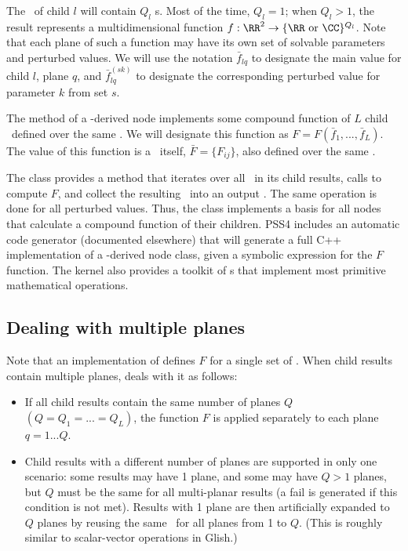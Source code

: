   The \Result\ of child $l$ will contain $Q_l$ \VellSet{}s. Most of the time,
  $Q_l=1$; when $Q_l>1$, the result represents a multidimensional function
  $f:\RR^2\rightarrow\{\RR\mbox{ or }\CC\}^{Q_l}$. Note that each plane of such
  a function may have its own set of solvable parameters and perturbed values.
  We will use the notation $\bar{f}_{lq}$ to designate the main value for child
  $l$, plane $q$, and $\bar{f}^{(sk)}_{lq}$ to designate the corresponding
  perturbed value for parameter $k$ from set $s$.

  The  method of a -derived node implements some
  compound function of $L$ child \Vells\ defined over the same \Cells. We will
  designate this function as $F=F(\bar{f}_1,...,\bar{f}_L)$. The value of this
  function is a \Vells\ itself, $\bar{F} = \{F_{ij}\}$, also defined over the
  same \Cells. 

  The  class provides a  method that iterates over
  all \Vells\ in its child results, calls  to compute $F$, and
  collect the resulting \Vells\ into an output \Result. The same operation is
  done for all perturbed values. Thus, the  class implements a
  basis for all nodes that calculate a compound function of their children.
  PSS4 includes an automatic code generator (documented elsewhere) that will
  generate a full C++ implementation of a -derived node class,
  given a symbolic expression for the $F$ function. The kernel also provides a
  toolkit of s that implement most primitive mathematical
  operations.

\subsection{Dealing with multiple planes}

  Note that an implementation of  defines $F$ for a single set of
  \Vells. When child results contain multiple planes,  deals with
  it as follows:
  
  \begin{itemize}
  
  \item If all child results contain the same number of planes $Q$
  $(Q=Q_1=...=Q_L)$, the function $F$ is applied separately to each plane 
  $q=1...Q$.

  \item Child results with a different number of planes are supported in only
  one scenario: some results may have 1 plane, and some may have $Q>1$ planes,
  but $Q$ must be the same for all multi-planar results (a fail is generated if
  this condition is not met). Results with 1 plane are then artificially
  expanded to $Q$ planes by reusing the same \VellSet\ for all planes from 1 to
  $Q$. (This is roughly similar to scalar-vector operations in Glish.)

  \end{itemize}
  
